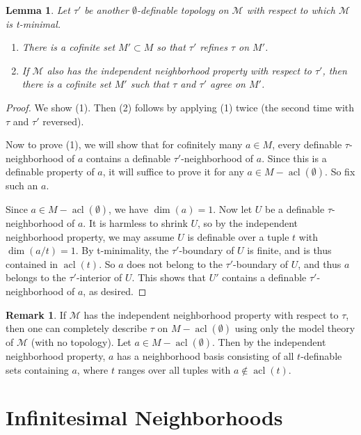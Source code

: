 \documentclass{amsart}
\newtheorem{lemma}[theorem]{Lemma}
\theoremstyle{definition}
\newtheorem{remark}[theorem]{Remark}
\newcommand{\acl}{\operatorname{acl}}
\begin{document}
    \begin{lemma}\label{L: unique top}
        Let $\tau'$ be another $\emptyset$-definable topology on $\mathcal M$ with respect to which $\mathcal M$ is t-minimal.
        \begin{enumerate}
            \item There is a cofinite set $M'\subset M$ so that $\tau'$ refines $\tau$ on $M'$.
            \item If $\mathcal M$ also has the independent neighborhood property with respect to $\tau'$, then there is a cofinite set $M'$ such that $\tau$ and $\tau'$ agree on $M'$.
        \end{enumerate}
    \end{lemma}
    \begin{proof}
        We show (1). Then (2) follows by applying (1) twice (the second time with $\tau$ and $\tau'$ reversed).

        Now to prove (1), we will show that for cofinitely many $a\in M$, every definable $\tau$-neighborhood of $a$ contains a definable $\tau'$-neighborhood of $a$. Since this is a definable property of $a$, it will suffice to prove it for any $a\in M-\acl(\emptyset)$. So fix such an $a$.

        Since $a\in M-\acl(\emptyset)$, we have $\dim(a)=1$. Now let $U$ be a definable $\tau$-neighborhood of $a$. It is harmless to shrink $U$, so by the independent neighborhood property, we may assume $U$ is definable over a tuple $t$ with $\dim(a/t)=1$. By t-minimality, the $\tau'$-boundary of $U$ is finite, and is thus contained in $\acl(t)$. So $a$ does not belong to the $\tau'$-boundary of $U$, and thus $a$ belongs to the $\tau'$-interior of $U$. This shows that $U'$ contains a definable $\tau'$-neighborhood of $a$, as desired.
    \end{proof}

    \begin{remark}
        If $\mathcal M$ has the independent neighborhood property with respect to $\tau$, then one can completely describe $\tau$ on $M-\acl(\emptyset)$ using only the model theory of $\mathcal M$ (with no topology). Let $a\in M-\acl(\emptyset)$. Then by the independent neighborhood property, $a$ has a neighborhood basis consisting of all $t$-definable sets containing $a$, where $t$ ranges over all tuples with $a\notin\acl(t)$.
    \end{remark}

\section{Infinitesimal Neighborhoods}
\end{document}
